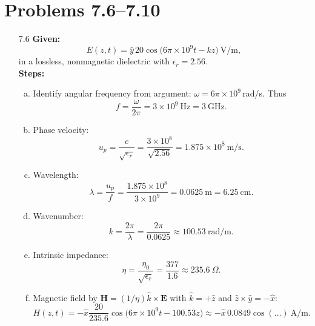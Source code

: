 \section*{Problems 7.6--7.10}
\begin{enumerate}

\item[7.6] \textbf{Given:}
\[E(z,t)=\hat y\,20\cos\bigl(6\pi\times10^9t - kz\bigr)\ \mathrm{V/m},\]
in a lossless, nonmagnetic dielectric with $\epsilon_r=2.56$.  
\\
\textbf{Steps:}
\begin{enumerate}[(a)]
  \item Identify angular frequency from argument: $\omega=6\pi\times10^9\,$rad/s.  Thus
  \[f=\frac{\omega}{2\pi}=3\times10^9~\mathrm{Hz}=3~\mathrm{GHz}.\]
  \item Phase velocity:
  \[u_p=\frac{c}{\sqrt{\epsilon_r}}=\frac{3\times10^8}{\sqrt{2.56}}=1.875\times10^8~\mathrm{m/s}.\]
  \item Wavelength:
  \[\lambda=\frac{u_p}{f}=\frac{1.875\times10^8}{3\times10^9}=0.0625~\mathrm m=6.25~\mathrm{cm}.\]
  \item Wavenumber:
  \[k=\frac{2\pi}{\lambda}=\frac{2\pi}{0.0625}\approx100.53~\mathrm{rad/m}.\]
  \item Intrinsic impedance:
  \[\eta=\frac{\eta_0}{\sqrt{\epsilon_r}}=\frac{377}{1.6}\approx235.6~\Omega.\]
  \item Magnetic field by $\mathbf H=(1/\eta)\hat k\times\mathbf E$ with $\hat k=+\hat z$ and $\hat z\times\hat y=-\hat x$:
  \[
    H(z,t)= -\hat x\frac{20}{235.6}\cos\bigl(6\pi\times10^9t-100.53z\bigr)\approx -\hat x\,0.0849\cos(\dots)~\mathrm{A/m}.
  \]
\end{enumerate}


\end{enumerate}
